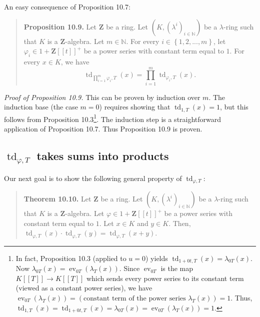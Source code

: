\documentclass[numbers=enddot,12pt,final,onecolumn,notitlepage]{scrartcl}%
\begin{document}
An easy consequence of Proposition 10.7:

\begin{quote}
\textbf{Proposition 10.9.} Let $\mathbf{Z}$ be a ring. Let $\left(  K,\left(
\lambda^{i}\right)  _{i\in\mathbb{N}}\right)  $ be a $\lambda$-ring such that
$K$ is a $\mathbf{Z}$-algebra. Let $m\in\mathbb{N}$. For every $i\in\left\{
1,2,...,m\right\}  $, let $\varphi_{i}\in1+\mathbf{Z}\left[  \left[  t\right]
\right]  ^{+}$ be a power series with constant term equal to $1$. For every
$x\in K$, we have%
\[
\operatorname*{td}\nolimits_{\prod\limits_{i=1}^{m}\varphi_{i},T}\left(
x\right)  =\prod\limits_{i=1}^{m}\operatorname*{td}\nolimits_{\varphi_{i}%
,T}\left(  x\right)  .
\]



\end{quote}

\textit{Proof of Proposition 10.9.} This can be proven by induction over $m$.
The induction base (the case $m=0$) requires showing that $\operatorname*{td}%
\nolimits_{1,T}\left(  x\right)  =1$, but this follows from Proposition
10.3\footnote{In fact, Proposition 10.3 (applied to $u=0$) yields
$\operatorname*{td}\nolimits_{1+0t,T}\left(  x\right)  =\lambda_{0T}\left(
x\right)  $. Now $\lambda_{0T}\left(  x\right)  =\operatorname*{ev}%
\nolimits_{0T}\left(  \lambda_{T}\left(  x\right)  \right)  $. Since
$\operatorname*{ev}\nolimits_{0T}$ is the map $K\left[  \left[  T\right]
\right]  \rightarrow K\left[  \left[  T\right]  \right]  $ which sends every
power series to its constant term (viewed as a constant power series), we have
$\operatorname*{ev}\nolimits_{0T}\left(  \lambda_{T}\left(  x\right)  \right)
=\left(  \text{constant term of the power series }\lambda_{T}\left(  x\right)
\right)  =1$. Thus, $\operatorname*{td}\nolimits_{1,T}\left(  x\right)
=\operatorname*{td}\nolimits_{1+0t,T}\left(  x\right)  =\lambda_{0T}\left(
x\right)  =\operatorname*{ev}\nolimits_{0T}\left(  \lambda_{T}\left(
x\right)  \right)  =1$.}. The induction step is a straightforward application
of Proposition 10.7. Thus Proposition 10.9 is proven.

\subsection{$\operatorname*{td}\nolimits_{\varphi,T}$ takes sums into
products}

Our next goal is to show the following general property of $\operatorname*{td}%
\nolimits_{\varphi,T}$:

\begin{quote}
\textbf{Theorem 10.10.} Let $\mathbf{Z}$ be a ring. Let $\left(  K,\left(
\lambda^{i}\right)  _{i\in\mathbb{N}}\right)  $ be a $\lambda$-ring such that
$K$ is a $\mathbf{Z}$-algebra. Let $\varphi\in1+\mathbf{Z}\left[  \left[
t\right]  \right]  ^{+}$ be a power series with constant term equal to $1$.
Let $x\in K$ and $y\in K$. Then, $\operatorname*{td}\nolimits_{\varphi
,T}\left(  x\right)  \cdot\operatorname*{td}\nolimits_{\varphi,T}\left(
y\right)  =\operatorname*{td}\nolimits_{\varphi,T}\left(  x+y\right)  $.
\end{quote}
\end{document}
